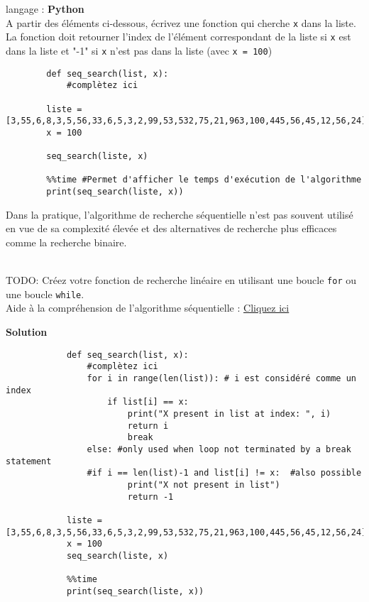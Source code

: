 \begin{Exercice}[5 minutes] langage : \textbf{Python}\\

A partir des éléments ci-dessous, écrivez une fonction qui cherche \lstinline{x} dans la liste.\\La fonction doit retourner l'index de l'élément correspondant de la liste si \lstinline{x} est dans la liste et "-1" si \lstinline{x} n'est pas dans la liste (avec \lstinline{x = 100})\\

    \begin{lstlisting}
        def seq_search(list, x):
            #complètez ici
            
        liste = [3,55,6,8,3,5,56,33,6,5,3,2,99,53,532,75,21,963,100,445,56,45,12,56,24]
        x = 100
        
        seq_search(liste, x)
        
        %%time #Permet d'afficher le temps d'exécution de l'algorithme 
        print(seq_search(liste, x))
    \end{lstlisting}

Dans la pratique, l'algorithme de recherche séquentielle n'est pas souvent utilisé en vue de sa complexité élevée et des alternatives de recherche plus efficaces comme la recherche binaire.\\\\

    \begin{conseil}
        TODO: Créez votre fonction de recherche linéaire en utilisant une boucle \lstinline{for} ou une boucle \lstinline{while}.\\
        Aide à la compréhension de l'algorithme séquentielle : \href{https://runestone.academy/runestone/books/published/pythonds/SortSearch/TheSequentialSearch.html\#lst-seqsearchpython}{Cliquez ici}
    \end{conseil}
    
    \begin{solution}
         
    \end{solution}
\textbf{Solution}
    \begin{lstlisting}
            def seq_search(list, x):
                #complètez ici
                for i in range(len(list)): # i est considéré comme un index
                    if list[i] == x:
                        print("X present in list at index: ", i)
                        return i
                        break
                else: #only used when loop not terminated by a break statement
                #if i == len(list)-1 and list[i] != x:  #also possible
                        print("X not present in list")
                        return -1
            
            liste = [3,55,6,8,3,5,56,33,6,5,3,2,99,53,532,75,21,963,100,445,56,45,12,56,24]
            x = 100
            seq_search(liste, x)
            
            %%time 
            print(seq_search(liste, x))
    \end{lstlisting}  
\end{Exercice}

